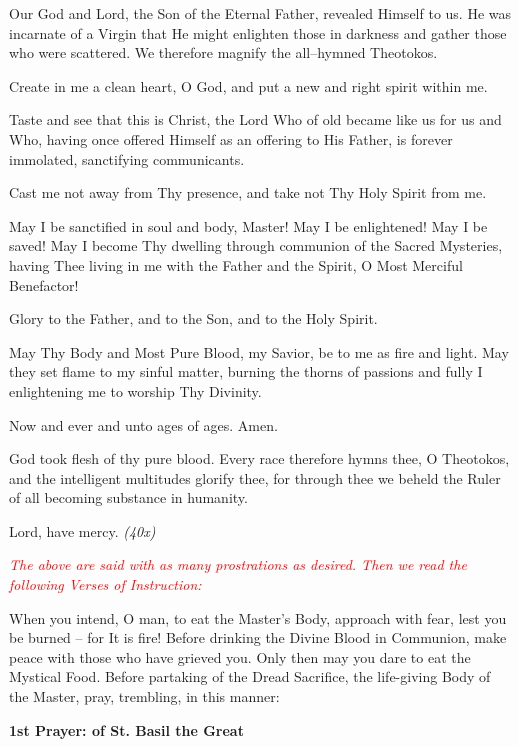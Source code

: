 \begin{hang}
\noindent{}Our God and Lord, the Son of the Eternal Father, revealed Himself to us. He was incarnate of a Virgin that He might enlighten those in darkness and gather those who were scattered. We therefore magnify the all--hymned Theotokos.

Create in me a clean heart, O God, and put a new and right spirit within me.

Taste and see that this is Christ, the Lord Who of old became like us for us and Who, having once offered Himself as an offering to His Father, is forever immolated, sanctifying communicants.

Cast me not away from Thy presence, and take not Thy Holy Spirit from me.

May I be sanctified in soul and body, Master! May I be enlightened! May I be saved! May I become Thy dwelling through communion of the Sacred Mysteries, having Thee living in me with the Father and the Spirit, O Most Merciful Benefactor!

Glory to the Father, and to the Son, and to the Holy Spirit.

May Thy Body and Most Pure Blood, my Savior, be to me as fire and light. May they set flame to my sinful matter, burning the thorns of passions and fully I enlightening me to worship Thy Divinity.

Now and ever and unto ages of ages. Amen.

God took flesh of thy pure blood. Every race therefore hymns thee, O Theotokos, and the intelligent multitudes glorify thee, for through thee we beheld the Ruler of all becoming substance in humanity.

Lord, have mercy. \textit{(40x)}

\end{hang}

\textcolor{red}{\textit{The above are said with as many prostrations as desired. Then we read the following Verses of Instruction:}}

When you intend, O man, to eat the Master's Body, approach with fear, lest you be burned -- for It is fire! Before drinking the Divine Blood in Communion, make peace with those who have grieved you. Only then
may you dare to eat the Mystical Food. Before partaking of the Dread Sacrifice, the life-giving Body of the Master, pray, trembling, in this manner: 

\begin{center}
\textbf{1st Prayer: of St. Basil the Great}
\end{center}

